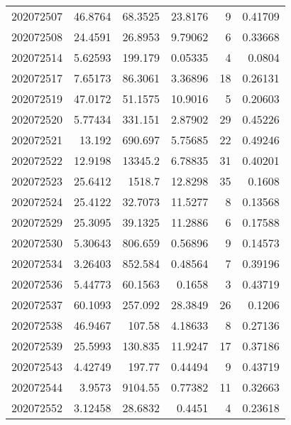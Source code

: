 \begin{tabular}{rrrrrr}
 202072507 &         46.8764  &       68.3525 &           23.8176  &           9 & 0.41709 \\
 202072508 &         24.4591  &       26.8953 &            9.79062 &           6 & 0.33668 \\
 202072514 &          5.62593 &      199.179  &            0.05335 &           4 & 0.0804  \\
 202072517 &          7.65173 &       86.3061 &            3.36896 &          18 & 0.26131 \\
 202072519 &         47.0172  &       51.1575 &           10.9016  &           5 & 0.20603 \\
 202072520 &          5.77434 &      331.151  &            2.87902 &          29 & 0.45226 \\
 202072521 &         13.192   &      690.697  &            5.75685 &          22 & 0.49246 \\
 202072522 &         12.9198  &    13345.2    &            6.78835 &          31 & 0.40201 \\
 202072523 &         25.6412  &     1518.7    &           12.8298  &          35 & 0.1608  \\
 202072524 &         25.4122  &       32.7073 &           11.5277  &           8 & 0.13568 \\
 202072529 &         25.3095  &       39.1325 &           11.2886  &           6 & 0.17588 \\
 202072530 &          5.30643 &      806.659  &            0.56896 &           9 & 0.14573 \\
 202072534 &          3.26403 &      852.584  &            0.48564 &           7 & 0.39196 \\
 202072536 &          5.44773 &       60.1563 &            0.1658  &           3 & 0.43719 \\
 202072537 &         60.1093  &      257.092  &           28.3849  &          26 & 0.1206  \\
 202072538 &         46.9467  &      107.58   &            4.18633 &           8 & 0.27136 \\
 202072539 &         25.5993  &      130.835  &           11.9247  &          17 & 0.37186 \\
 202072543 &          4.42749 &      197.77   &            0.44494 &           9 & 0.43719 \\
 202072544 &          3.9573  &     9104.55   &            0.77382 &          11 & 0.32663 \\
 202072552 &          3.12458 &       28.6832 &            0.4451  &           4 & 0.23618 \\

\end{tabular}
